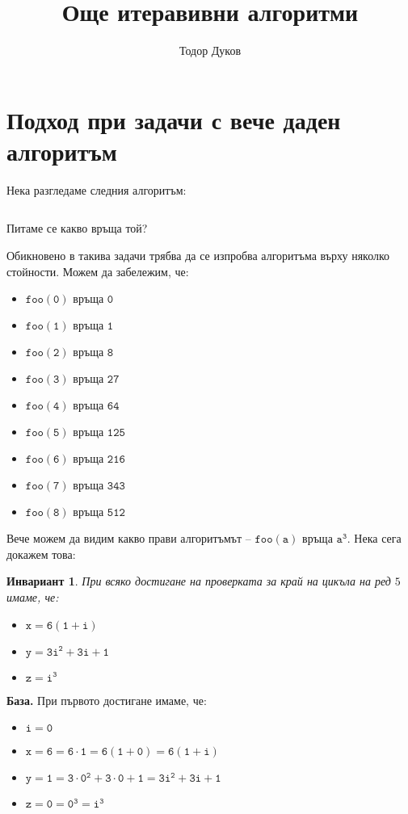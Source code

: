 \documentclass{article}
\title{Още итеравивни алгоритми}
\author{Тодор Дуков}
\date{}
\theoremstyle{definition}
\theoremstyle{plain}
\newtheorem*{invariant}{Инвариант}
\theoremstyle{remark}
\theoremstyle{definition}
\begin{document}
\maketitle

\section*{Подход при задачи с вече даден алгоритъм}

Нека разгледаме следния алгоритъм:
\inputminted[linenos]{c++}{algorithms/foo.cpp}
Питаме се какво връща той?

Обикновено в такива задачи трябва да се изпробва алгоритъма върху няколко стойности.
Можем да забележим, че:
\begin{itemize}
    \item $\mathtt{foo(0) \text{ връща } 0}$
    \item $\mathtt{foo(1) \text{ връща } 1}$
    \item $\mathtt{foo(2) \text{ връща } 8}$
    \item $\mathtt{foo(3) \text{ връща } 27}$
    \item $\mathtt{foo(4) \text{ връща } 64}$
    \item $\mathtt{foo(5) \text{ връща } 125}$
    \item $\mathtt{foo(6) \text{ връща } 216}$
    \item $\mathtt{foo(7) \text{ връща } 343}$
    \item $\mathtt{foo(8) \text{ връща } 512}$
\end{itemize}

Вече можем да видим какво прави алгоритъмът -- $\mathtt{foo(a) \text{ връща } a^3}$.
Нека сега докажем това:
\begin{invariant}
    При всяко достигане на проверката за край на цикъла на ред $5$ имаме, че:
    \begin{itemize}
        \item $\mathtt{x = 6 (1 + i)}$
        \item $\mathtt{y = 3i^2 + 3i + 1}$
        \item $\mathtt{z = i^3}$
    \end{itemize}
\end{invariant}

\textbf{База.}
При първото достигане имаме, че:
\begin{itemize}
    \item $\mathtt{i = 0}$
    \item $\mathtt{x = 6 = 6 \cdot 1 = 6 (1 + 0) = 6 (1 + i)}$
    \item $\mathtt{y = 1 = 3 \cdot 0^2 + 3 \cdot 0 + 1 = 3i^2 + 3i + 1}$
    \item $\mathtt{z = 0 = 0^3 = i^3}$
\end{itemize}
\end{document}

